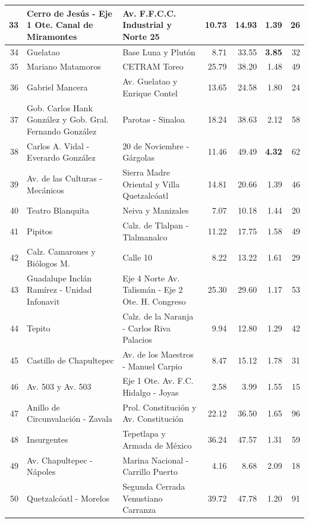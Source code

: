 {\begin{longtable}{|r|p{5.0cm}|p{5.0cm}|r|r|r|r|}
  \hline
  33 & Cerro de Jesús - Eje 1 Ote. Canal de Miramontes & Av. F.F.C.C. Industrial y Norte 25 & 10.73 & 14.93 & 1.39 & 26 \\
  \hline
  34 & Guelatao & Base Luna y Plutón & 8.71 & 33.55 & \textbf{3.85} & 32 \\
  \hline
  35 & Mariano Matamoros & CETRAM Toreo & 25.79 & 38.20 & 1.48 & 49 \\
  \hline
  36 & Gabriel Mancera & Av. Guelatao y Enrique Contel & 13.65 & 24.58 & 1.80 & 24 \\
  \hline
  37 & Gob. Carlos Hank González y Gob. Gral. Fernando González & Parotas - Sinaloa & 18.24 & 38.63 & 2.12 & 58 \\
  \hline
  38 & Carlos A. Vidal - Everardo González & 20 de Noviembre - Gárgolas & 11.46 & 49.49 & \textbf{4.32} & 62 \\
  \hline
  39 & Av. de las Culturas - Mecánicos & Sierra Madre Oriental y Villa Quetzalcóatl & 14.81 & 20.66 & 1.39 & 46 \\
  \hline
  40 & Teatro Blanquita & Neiva y Manizales & 7.07 & 10.18 & 1.44 & 20 \\
  \hline
  41 & Pipitos & Calz. de Tlalpan - Tlalmanalco & 11.22 & 17.75 & 1.58 & 49 \\
  \hline
  42 & Calz. Camarones y Biólogos M. & Calle 10 & 8.22 & 13.22 & 1.61 & 29 \\
  \hline
  43 & Guadalupe Inclán Ramírez - Unidad Infonavit & Eje 4 Norte Av. Talismán - Eje 2 Ote. H. Congreso & 25.30 & 29.60 & 1.17 & 53 \\
  \hline
  44 & Tepito & Calz. de la Naranja - Carlos Riva Palacios & 9.94 & 12.80 & 1.29 & 42 \\
  \hline
  45 & Castillo de Chapultepec & Av. de los Maestros - Manuel Carpio & 8.47 & 15.12 & 1.78 & 31 \\
  \hline
  46 & Av. 503 y Av. 503 & Eje 1 Ote. Av. F.C. Hidalgo - Joyas & 2.58 & 3.99 & 1.55 & 15 \\
  \hline
  47 & Anillo de Circunvalación - Zavala & Prol. Constitución y Av. Constitución & 22.12 & 36.50 & 1.65 & 96 \\
  \hline
  48 & Insurgentes & Tepetlapa y Armada de México & 36.24 & 47.57 & 1.31 & 59 \\
  \hline
  49 & Av. Chapultepec - Nápoles & Marina Nacional - Carrillo Puerto & 4.16 & 8.68 & 2.09 & 18 \\
  \hline
  50 & Quetzalcóatl - Morelos & Segunda Cerrada Venustiano Carranza & 39.72 & 47.78 & 1.20 & 91 \\

\end{longtable}}
